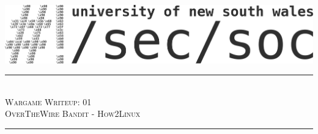 \documentclass[11pt]{article}
\newcommand{\HRule}{\rule{\linewidth}{0.2mm}}               %
\begin{document}
\begin{titlepage}
\center	


\vspace*{2cm}
\includegraphics{secsoc-logobanner.png}
\vspace*{1.5cm}

\HRule \\[0.4cm]
\textsc{\Large Wargame Writeup: 01}\\[0.5cm]             %
\textsc{\large OverTheWire Bandit - How2Linux}\\[0.5cm]  %
\HRule \\[2.5cm]    





\end{titlepage}
\end{document}
